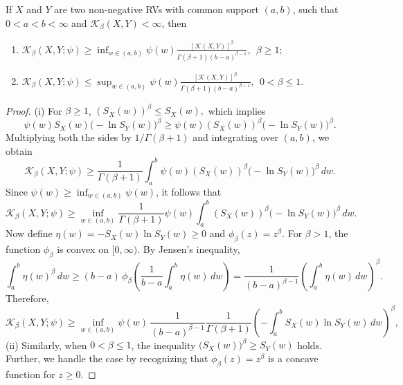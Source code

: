 \documentclass[10pt,a4paper]{amsart}
\begin{document}
	\begin{theorem}
		If $X$ and $Y$ are two non-negative RVs with common support $(a,b)$, such that $0<a<b<\infty$ and $\mathcal K_\beta(X,Y)<\infty$, then 
			\begin{enumerate}
				\item [(i)]		$	\mathcal K_\beta(X, Y;\psi)\geq \inf_{w\in(a,b)}\psi(w)\frac{[\mathcal    {K}(X,Y)]^\beta}{\Gamma{(\beta+1)}(b-a)^{\beta-1}},~~\beta\geq 1;$
				\item[(ii)]	$\mathcal K_\beta(X, Y;\psi)\leq \sup_{w\in(a,b)}\psi(w)\frac{[\mathcal K(X,Y)]^\beta}{\Gamma(\beta+1)(b-a)^{\beta-1}},~~0<\beta\leq 1.$
				\end{enumerate}
	\end{theorem}	

	\begin{proof}
	(i)	For $\beta \ge 1$, $(S_X(w))^\beta \le S_X(w),$
		which implies
		\[
		\psi(w)S_X(w)\big(-\ln S_Y(w)\big)^\beta 
		\ge \psi(w)(S_X(w))^\beta\big(-\ln S_Y(w)\big)^\beta.
		\]
		Multiplying both the sides by $1/\Gamma(\beta+1)$ and integrating over $(a,b)$, we obtain
		\[
		\mathcal{K}_\beta(X,Y;\psi)
		\ge\frac{1}{\Gamma(\beta+1)} \int_a^b \psi(w)(S_X(w))^\beta\big(-\ln S_Y(w)\big)^\beta\,dw.
		\]
		Since $\psi(w)\ge \inf_{w\in(a,b)}\psi(w)$, it follows that
		\[
		\mathcal{K}_\beta(X,Y;\psi)
		\ge \inf_{w\in(a,b)}\frac{1}{\Gamma(\beta+1)}\psi(w)\int_a^b (S_X(w))^\beta\big(-\ln S_Y(w)\big)^\beta\,dw.
		\]
		Now define $\eta(w)=-S_X(w)\ln S_Y(w)\ge 0$ and $\phi_\beta(z)=z^\beta$.  
		For $\beta>1$, the function $\phi_\beta$ is convex on $[0,\infty)$.  
		By Jensen's inequality,
		\[
		\int_a^b \eta(w)^\beta\,dw
		\ge (b-a)\,\phi_\beta\!\left(\frac{1}{b-a}\int_a^b \eta(w)\,dw\right)
		= \frac{1}{(b-a)^{\beta-1}}\left(\int_a^b \eta(w)\,dw\right)^\beta.
		\]
		Therefore,
		\[
		\mathcal{K}_\beta(X,Y;\psi)
		\ge \inf_{w\in(a,b)}\psi(w)\,
		\frac{1}{(b-a)^{\beta-1}}\frac{1}{\Gamma(\beta+1)}
		\left(-\int_a^b S_X(w)\ln S_Y(w)\,dw\right)^\beta,
		\]
(ii)	Similarly, when $0 < \beta \leq 1$, the inequality
$
\big(S_X(w)\big)^\beta \geq S_Y(w)
$
holds.   Further, we handle the case by recognizing that $\phi_\beta(z) = z^\beta$ is a concave function for $z \geq 0$.  
	\end{proof}
\end{document}

